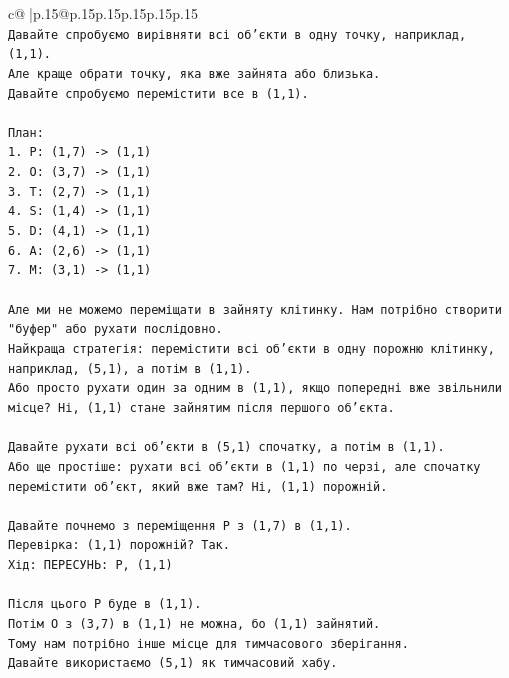 \documentclass{article}
\begin{document}
{\begin{supertabular}{c@{$\;$}|p{.15\linewidth}@{}p{.15\linewidth}p{.15\linewidth}p{.15\linewidth}p{.15\linewidth}p{.15\linewidth}}
{{{\\ 
\texttt{Давайте спробуємо вирівняти всі об'єкти в одну точку, наприклад, (1,1).} \\
\texttt{Але краще обрати точку, яка вже зайнята або близька.} \\
\texttt{Давайте спробуємо перемістити все в (1,1).} \\
\\ 
\texttt{План:} \\
\texttt{1. P: (1,7) {-}> (1,1)} \\
\texttt{2. O: (3,7) {-}> (1,1)} \\
\texttt{3. T: (2,7) {-}> (1,1)} \\
\texttt{4. S: (1,4) {-}> (1,1)} \\
\texttt{5. D: (4,1) {-}> (1,1)} \\
\texttt{6. A: (2,6) {-}> (1,1)} \\
\texttt{7. M: (3,1) {-}> (1,1)} \\
\\ 
\texttt{Але ми не можемо переміщати в зайняту клітинку. Нам потрібно створити "буфер" або рухати послідовно.} \\
\texttt{Найкраща стратегія: перемістити всі об'єкти в одну порожню клітинку, наприклад, (5,1), а потім в (1,1).} \\
\texttt{Або просто рухати один за одним в (1,1), якщо попередні вже звільнили місце? Ні, (1,1) стане зайнятим після першого об'єкта.} \\
\\ 
\texttt{Давайте рухати всі об'єкти в (5,1) спочатку, а потім в (1,1).} \\
\texttt{Або ще простіше: рухати всі об'єкти в (1,1) по черзі, але спочатку перемістити об'єкт, який вже там? Ні, (1,1) порожній.} \\
\\ 
\texttt{Давайте почнемо з переміщення P з (1,7) в (1,1).} \\
\texttt{Перевірка: (1,1) порожній? Так.} \\
\texttt{Хід: ПЕРЕСУНЬ: P, (1,1)} \\
\\ 
\texttt{Після цього P буде в (1,1).} \\
\texttt{Потім O з (3,7) в (1,1) не можна, бо (1,1) зайнятий.} \\
\texttt{Тому нам потрібно інше місце для тимчасового зберігання.} \\
\texttt{Давайте використаємо (5,1) як тимчасовий хабу.} \\
\\ 
}}}
\end{supertabular}}
\end{document}
